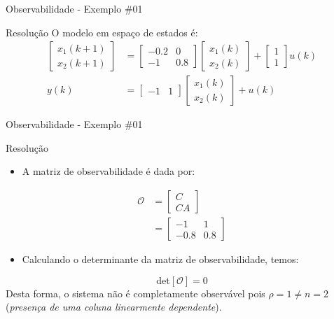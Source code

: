 \begin{frame}{Observabilidade - Exemplo \#01}
\begin{block}{Resolução}
O modelo em espaço de estados é:
\begin{align*}
    \begin{bmatrix} x_1(k+1) \\ x_2(k+1) \end{bmatrix}
    &=
    \begin{bmatrix}
    -\num{0,2} & 0 \\ -1 & \num{0,8}
    \end{bmatrix}
    \begin{bmatrix}
    x_1(k) \\ x_2(k)
    \end{bmatrix}
    +
    \begin{bmatrix}
    1 \\ 1
    \end{bmatrix}
    u(k) \\
    y(k)
    &=
    \begin{bmatrix}
    -1 & 1
    \end{bmatrix}
    \begin{bmatrix}
    x_1(k) \\ x_2(k)
    \end{bmatrix}
    + u(k)
\end{align*}
\end{block}
\end{frame}

\begin{frame}{Observabilidade - Exemplo \#01}
\begin{block}{Resolução}
\begin{itemize}
    \item A matriz de observabilidade é dada por:
\end{itemize}
\begin{align*}
    \mathcal{O} &= \begin{bmatrix} C \\ CA \end{bmatrix} \\
    &= \begin{bmatrix} -1 & 1 \\ -\num{0,8} & \num{0,8} \end{bmatrix}
\end{align*}
\vspace{-0.3cm}
\begin{itemize}
    \item Calculando o determinante da matriz de observabilidade, temos:
\end{itemize}
$$\text{det}[\mathcal{O}] = 0 $$
Desta forma, o sistema não é completamente observável pois $\rho = 1 \neq n = 2$ (\textit{presença de uma coluna linearmente dependente}).
\end{block}
\end{frame}

